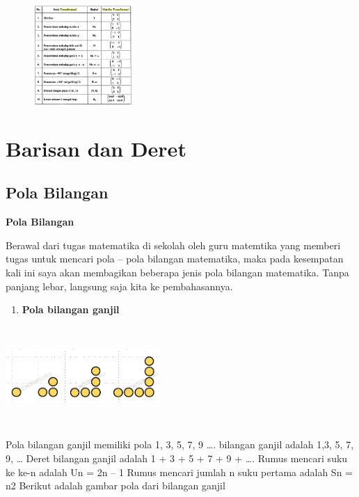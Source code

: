 \documentclass[11pt,fleqn]{book} %
\begin{document}
\noindent
\begin{center}
	\noindent \includegraphics*[width=2.32in, height=1.48in, keepaspectratio=false, trim=0.00in 0.11in 0.00in 0.00in]{Pictures/19.PNG}
\end{center}
\noindent




\chapter{Barisan dan Deret}

\section{Pola Bilangan}
\begin{center}
	\LARGE \textbf{Pola Bilangan}
\end{center}
\noindent
Berawal dari tugas matematika di sekolah oleh guru matemtika yang memberi tugas untuk mencari pola – pola bilangan matematika, maka pada kesempatan kali ini saya akan membagikan beberapa jenis pola bilangan matematika. Tanpa panjang lebar, langsung saja kita ke pembahasannya.
\noindent
\begin{enumerate}
	\item  \textbf{Pola bilangan ganjil}
\end{enumerate}
\noindent
\begin{center}
	\noindent \includegraphics*[width=2.32in, height=1.48in, keepaspectratio=false, trim=0.00in 0.11in 0.00in 0.00in]{Pictures/21.PNG}
\end{center}
\noindent
\noindent Pola bilangan ganjil memiliki pola 1, 3, 5, 7, 9 ….
\noindent bilangan ganjil adalah 1,3, 5, 7, 9, …
\noindent Deret bilangan ganjil adalah 1 + 3 + 5 + 7 + 9 + ….
\noindent Rumus mencari suku ke ke-n adalah Un = 2n – 1
\noindent
\noindent
\noindent Rumus mencari jumlah n suku pertama adalah Sn = n2
\noindent
\noindent
\noindent
\noindent Berikut adalah gambar pola dari bilangan ganjil
\end{document}
